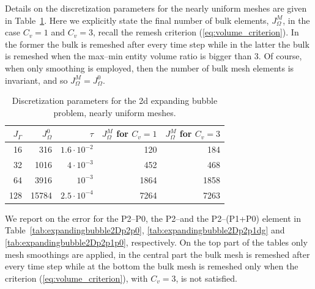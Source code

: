 Details on the discretization parameters for the nearly uniform meshes are
given in Table~\ref{tab:expandingbubble2Delements}. Here we explicitly
state the final number of bulk elements, $J_\Omega^M$, in the case $C_v = 1$
and $C_v = 3$, recall the remesh criterion (\ref{eq:volume_criterion}). In the
former the bulk is remeshed after every time step while in the latter the bulk
is remeshed when the max--min entity volume ratio is bigger than 3. Of course,
when only smoothing is employed, then the number of bulk mesh elements is
invariant, and so $J_\Omega^M = J_\Omega^0$.
\begin{table}
\center
\begin{tabular}{rrrrr}
\hline
$J_\Gamma$ & $J_\Omega^0$ & $\tau$ & $J_\Omega^M$ for $C_v=1$ &
$J_\Omega^M$ for $C_v=3$ \\
\hline
 16 &   316 & $1.6\cdot10^{-2}$ &  120 &  184 \\
 32 &  1016 &   $4\cdot10^{-3}$ &  452 &  468 \\
 64 &  3916 &         $10^{-3}$ & 1864 & 1858 \\
128 & 15784 & $2.5\cdot10^{-4}$ & 7264 & 7263 \\
\hline
\end{tabular}
\caption[Stokes expanding bubble uniform meshes parameters]
{Discretization parameters for the 2d expanding bubble problem, nearly uniform
meshes.}
\label{tab:expandingbubble2Delements}
\end{table}
We report on the error for the P2--P0, the P2--\pdg and the P2--(P1+P0)
element in Table~\ref{tab:expandingbubble2Dp2p0},
\ref{tab:expandingbubble2Dp2p1dg} and \ref{tab:expandingbubble2Dp2p1p0},
respectively. On the top part of the tables only mesh smoothings are applied,
in the central part the bulk mesh is remeshed after every time step while at
the bottom the bulk mesh is remeshed only when the criterion
(\ref{eq:volume_criterion}), with $C_v=3$, is not satisfied.
